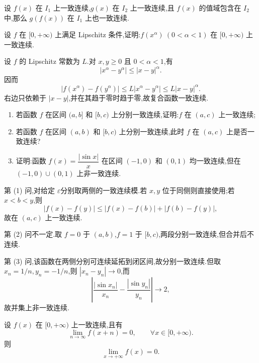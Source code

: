 \begin{proposition}
    设 $f(x)$ 在 $I_1$ 上一致连续,$g(x)$ 在 $I_2$ 上一致连续,且 $f(x)$ 的值域包含在 $I_2$ 中,那么 $g(f(x))$ 在 $I_1$ 上也一致连续.
\end{proposition}

\begin{example}
    设 $f$ 在 $\lbrack 0,+\infty)$ 上满足 Lipschitz 条件,证明:$f(x^\alpha)\ (0<\alpha<1)$ 在 $\lbrack 0,+\infty)$ 上一致连续.
\end{example}
\exampleblank

\begin{solution}
    设 $f$ 的 Lipschitz 常数为 $L$.对 $x,y\geq0$ 且 $0<\alpha<1$,有
    \[
        |x^\alpha-y^\alpha|\leq|x-y|^\alpha.
    \]
    因而
    \[
        |f(x^\alpha)-f(y^\alpha)|\leq L|x^\alpha-y^\alpha|
        \leq L|x-y|^\alpha.
    \]
    右边只依赖于 $|x-y|$,并在其趋于零时趋于零,故复合函数一致连续.
\end{solution}

\begin{example}[区间合并]
    \begin{enumerate}
        \item 若函数 $f$ 在区间 $(a,b\rbrack$ 和 $\lbrack b,c)$ 上分别一致连续,证明:$f$ 在 $(a,c)$ 上一致连续;
        \item 若函数 $f$ 在区间 $(a,b)$ 和 $\lbrack b,c)$ 上分别一致连续,此时 $f$ 在 $(a,c)$ 上是否一致连续?
        \item 证明:函数 $f(x)=\dfrac{|\sin x|}{x}$ 在区间 $(-1,0)$ 和 $(0,1)$ 均一致连续,但在 $(-1,0)\cup(0,1)$ 上非一致连续.
    \end{enumerate}
\end{example}
\exampleblank

\begin{solution}
    第 (1) 问,对给定 $\varepsilon$分别取两侧的一致连续模.若 $x,y$ 位于同侧则直接使用;若 $x<b<y$,则
    \[
        |f(x)-f(y)|\leq|f(x)-f(b)|+|f(b)-f(y)|,
    \]
    故在 $(a,c)$ 上一致连续.

    第 (2) 问不一定.取 $f=0$ 于 $(a,b)$,$f=1$ 于 $\lbrack b,c)$,两段分别一致连续,但合并后不连续.

    第 (3) 问,该函数在两侧分别可连续延拓到闭区间,故分别一致连续.但取 $x_n=1/n,y_n=-1/n$,则 $|x_n-y_n|\to0$,而
    \[
        \left|\dfrac{|\sin x_n|}{x_n}-\dfrac{|\sin y_n|}{y_n}\right|\to2,
    \]
    故并集上非一致连续.
\end{solution}

\begin{example}
    设 $f(x)$ 在 $\lbrack 0,+\infty)$ 上一致连续,且有
    \[
        \lim\limits_{n\to\infty}f(x+n)=0,
        \qquad \forall x\in\lbrack 0,+\infty).
    \]
    则
    \[
        \lim\limits_{x\to+\infty}f(x)=0.
    \]
\end{example}
\exampleblank

